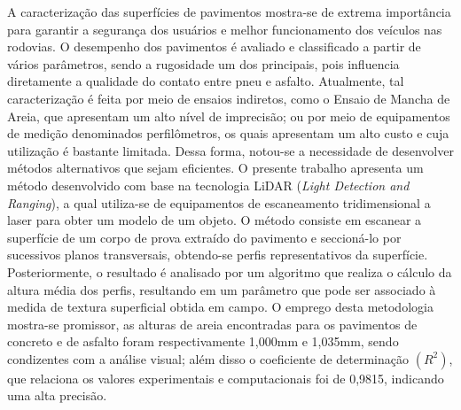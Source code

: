 
\setlength{\absparsep}{18pt} 
\begin{resumo}

\noindent 
A caracterização das superfícies de pavimentos mostra-se de extrema importância para garantir a segurança dos usuários e melhor funcionamento dos veículos nas rodovias. O desempenho dos pavimentos é avaliado e classificado a partir de vários parâmetros, sendo a rugosidade um dos principais, pois influencia diretamente a qualidade do contato entre pneu e asfalto. Atualmente, tal caracterização é feita por meio de ensaios indiretos, como o Ensaio de Mancha de Areia, que apresentam um alto nível de imprecisão; ou por meio de equipamentos de medição denominados perfilômetros, os quais apresentam um alto custo e cuja utilização é bastante limitada. Dessa forma, notou-se a necessidade de desenvolver métodos alternativos que sejam eficientes. O presente trabalho apresenta um método desenvolvido com base na tecnologia LiDAR (\emph{Light Detection and Ranging}), a qual utiliza-se de equipamentos de escaneamento tridimensional a laser para obter um modelo de um objeto. O método consiste em escanear a superfície de um corpo de prova extraído do pavimento e seccioná-lo por sucessivos planos transversais, obtendo-se perfis representativos da superfície. Posteriormente, o resultado é analisado por um algoritmo que realiza o cálculo da altura média dos perfis, resultando em um parâmetro que pode ser associado à medida de textura superficial obtida em campo. O emprego desta metodologia mostra-se promissor, as alturas de areia encontradas para os pavimentos de concreto e de asfalto foram respectivamente 1,000mm e 1,035mm, sendo condizentes com a análise visual; além disso o coeficiente de determinação $(R^2)$, que relaciona os valores experimentais e computacionais foi de 0,9815, indicando uma alta precisão.

\vspace{1cm}


\end{resumo}
